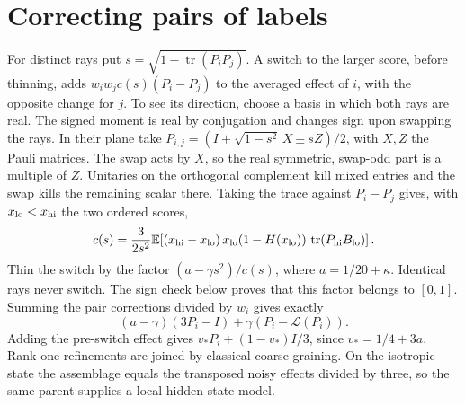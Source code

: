 \documentclass[10pt,a4paper]{article}
\newcommand{\tr}{\operatorname{tr}}
\newcommand{\E}{\mathbb E}
\begin{document}
\section{Correcting pairs of labels}
For distinct rays put \(s=\sqrt{1-\tr(P_iP_j)}\). A switch to the larger
score, before thinning, adds \(w_iw_j c(s)(P_i-P_j)\) to the averaged effect
of \(i\), with the opposite change for \(j\). To see its direction, choose a
basis in which both rays are real. The signed moment is real by conjugation
and changes sign upon swapping the rays. In their plane take
\(P_{i,j}=(I+\sqrt{1-s^2}\,X\pm sZ)/2\), with \(X,Z\) the Pauli matrices.
The swap acts by \(X\), so the real symmetric, swap-odd part is a multiple
of \(Z\). Unitaries on the orthogonal complement kill mixed entries and the
swap kills the remaining scalar there. Taking the trace against \(P_i-P_j\)
gives, with \(x_{\rm lo}<x_{\rm hi}\) the two ordered scores,
\[
 c(s)=\frac{3}{2s^2}\E\!\left[(x_{\rm hi}-x_{\rm lo})\,x_{\rm lo}
       (1-H(x_{\rm lo}))\,\tr(P_{\rm hi}B_{\rm lo})\right].
\]
Thin the switch by the factor \((a-\gamma s^2)/c(s)\), where \(a=1/20+\kappa\). Identical rays
never switch. The sign check below proves that this factor belongs to
\([0,1]\). Summing the pair corrections divided by \(w_i\) gives exactly
\[
 (a-\gamma)(3P_i-I)+\gamma(P_i-\mathcal L(P_i)).
\]
Adding the pre-switch effect gives \(v_*P_i+(1-v_*)I/3\), since \(v_*=1/4+3a\).
Rank-one refinements are joined by classical coarse-graining. On the
isotropic state the assemblage equals the transposed noisy effects divided
by three, so the same parent supplies a local hidden-state model.
\end{document}
